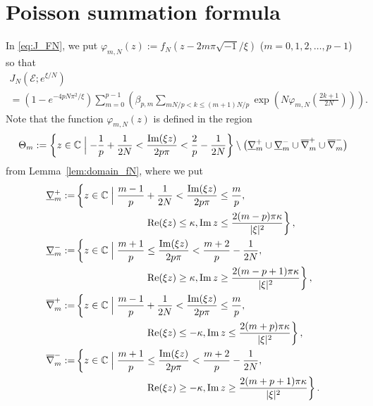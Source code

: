 \documentclass[a4paper,dvipdfmx]{amsart}
\theoremstyle{plain}
\theoremstyle{definition}
\theoremstyle{remark}
\newcommand{\C}{\mathbb{C}}
\renewcommand{\Re}{\operatorname{Re}}
\renewcommand{\Im}{\operatorname{Im}}
\newcommand{\FE}{\mathscr{E}}
\renewcommand{\i}{\sqrt{-1}}
\numberwithin{equation}{section}
\begin{document}
\section{Poisson summation formula}\label{sec:Poisson}
In \eqref{eq:J_FN}, we put $\varphi_{m,N}(z):=f_N(z-2m\pi\i/\xi)$ ($m=0,1,2,\dots,p-1$) so that
\begin{multline}\label{eq:J_phiN}
  J_N(\FE;e^{\xi/N})
  \\
  =
  \left(1-e^{-4pN\pi^2/\xi}\right)
  \sum_{m=0}^{p-1}
  \left(
    \beta_{p,m}
    \sum_{mN/p<k\le(m+1)N/p}
    \exp\left(N\varphi_{m,N}\left(\frac{2k+1}{2N}\right)\right)
  \right).
\end{multline}
Note that the function $\varphi_{m,N}(z)$ is defined in the region
\begin{equation*}
  \Theta_m
  :=
  \left\{
    z\in\C
    \Bigm|
    -\frac{1}{p}+\frac{1}{2N}<\frac{\Im(\xi z)}{2p\pi}<\frac{2}{p}-\frac{1}{2N}
  \right\}
  \setminus
  \bigl(
    \underline{\nabla}_{m}^{+}
    \cup
    \underline{\nabla}_{m}^{-}
    \cup
    \overline{\nabla}_{m}^{+}
    \cup
    \overline{\nabla}_{m}^{-}
  \bigr)
\end{equation*}
from Lemma~\ref{lem:domain_fN}, where we put
\begin{align*}
  \underline{\nabla}_{m}^{+}
  :=&
  \left\{
    z\in\C\Bigm|
    \frac{m-1}{p}+\frac{1}{2N}<\frac{\Im(\xi z)}{2p\pi}\le\frac{m}{p},
  \right.
  \\
  &\qquad\qquad\phantom{z\in\C\Bigm|}
  \left.
    \Re(\xi z)\le\kappa,
    \Im{z}\le\frac{2(m-p)\pi\kappa}{|\xi|^2}
  \right\},
  \\
  \underline{\nabla}_{m}^{-}
  :=&
  \left\{
    z\in\C\Bigm|
    \frac{m+1}{p}\le\frac{\Im(\xi z)}{2p\pi}<\frac{m+2}{p}-\frac{1}{2N},
  \right.
  \\
  &\qquad\qquad\phantom{z\in\C\Bigm|}
  \left.
    \Re(\xi z)\ge\kappa,
    \Im{z}\ge\frac{2(m-p+1)\pi\kappa}{|\xi|^2}
  \right\},
  \\
  \overline{\nabla}_{m}^{+}
  :=&
  \left\{
    z\in\C\Bigm|
    \frac{m-1}{p}+\frac{1}{2N}<\frac{\Im(\xi z)}{2p\pi}\le\frac{m}{p},
  \right.
  \\
  &\qquad\qquad\phantom{z\in\C\Bigm|}
  \left.
    \Re(\xi z)\le-\kappa,
    \Im{z}\le\frac{2(m+p)\pi\kappa}{|\xi|^2}
  \right\},
  \\
  \overline{\nabla}_{m}^{-}
  :=&
  \left\{
    z\in\C\Bigm|
    \frac{m+1}{p}\le\frac{\Im(\xi z)}{2p\pi}<\frac{m+2}{p}-\frac{1}{2N},
  \right.
  \\
  &\qquad\qquad\phantom{z\in\C\Bigm|}
  \left.
    \Re(\xi z)\ge-\kappa,
    \Im{z}\ge\frac{2(m+p+1)\pi\kappa}{|\xi|^2}
  \right\}.
\end{align*}
\end{document}
